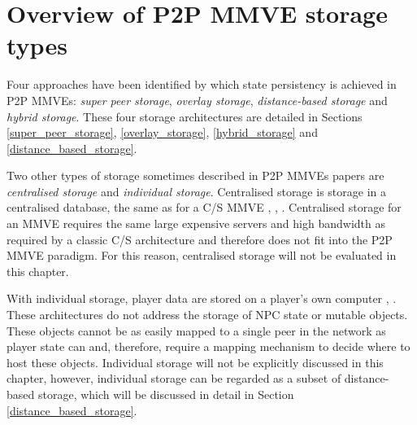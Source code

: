 \section{Overview of P2P MMVE storage types}
\label{storage_type_overview}

Four approaches have been identified by which state persistency is achieved in P2P MMVEs: \emph{super peer storage}, \emph{overlay storage}, \emph{distance-based storage} and \emph{hybrid storage}. These four storage architectures are detailed in Sections \ref{super_peer_storage}, \ref{overlay_storage}, \ref{hybrid_storage} and \ref{distance_based_storage}.

Two other types of storage sometimes described in P2P MMVEs papers are \emph{centralised storage} and \emph{individual storage}. Centralised storage is storage in a centralised database, the same as for a C/S MMVE \cite{badumna_engine}, \cite{rooney_centralised_storage}, \cite{hybrid_p2p_cs_centralised}. Centralised storage for an MMVE requires the same large expensive servers and high bandwidth as required by a classic C/S architecture and therefore does not fit into the P2P MMVE paradigm. For this reason, centralised storage will not be evaluated in this chapter.

With individual storage, player data are stored on a player's own computer \cite{individual_storage1}, \cite{cheat_proof_playout}. These
architectures do not address the storage of NPC state or mutable objects. These objects cannot be as easily mapped to a single peer in the network as
player state can and, therefore, require a mapping mechanism to decide where to host these objects. Individual storage will not be explicitly discussed
in this chapter, however, individual storage can be regarded as a subset of distance-based storage, which will be discussed in detail in Section
\ref{distance_based_storage}.

